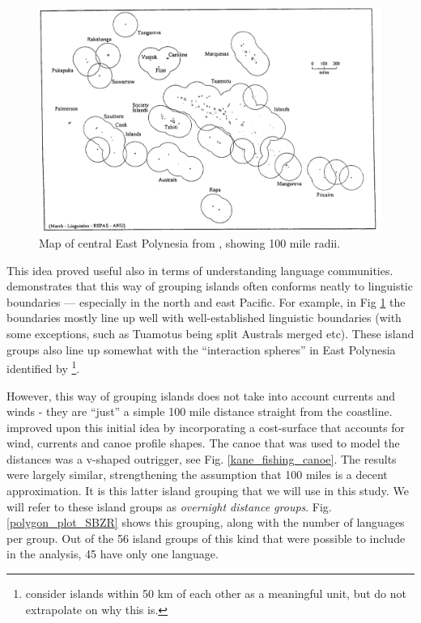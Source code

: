 \documentclass[unnumsec,webpdf,modern,medium]{oup-authoring-template}
\begin{document}
\begin{appendices}
\begin{figure}[ht]
\centering
\includegraphics[width=\textwidth]{marck_2000_east_poly.png}
\caption{{Map of central East Polynesia from \citet{marck2000}, showing 100 mile radii.}}
\label{Marck_2000_east_poly}
\end{figure}

This idea proved useful also in terms of understanding language communities. \citet{mark_1986, marck2000} demonstrates that this way of grouping islands often conforms neatly to linguistic boundaries --- especially in the north and east Pacific. For example, in Fig  \ref{Marck_2000_east_poly} the boundaries mostly line up well with well-established linguistic boundaries (with some exceptions, such as Tuamotus being split Australs merged etc). These island groups also line up somewhat with the ``interaction spheres'' in East Polynesia identified by \citet{rolett2002voyaging}\footnote{\citet{rolett2004environmental} consider islands within 50 km of each other as a meaningful unit, but do not extrapolate on why this is.}. 

However, this way of grouping islands does not take into account currents and winds - they are ``just'' a simple 100 mile distance straight from the coastline. \citet{NZSA_overnight_2023} improved upon this initial idea by incorporating a cost-surface that accounts for wind, currents and canoe profile shapes. The canoe that was used to model the distances was a v-shaped outrigger, see Fig. \ref{kane_fishing_canoe}. The results were largely similar, strengthening the assumption that 100 miles is a decent approximation. It is this latter island grouping that we will use in this study. We will refer to these island groups as \textit{overnight distance groups}. Fig. \ref{polygon_plot_SBZR} shows this grouping, along with the number of languages per group. Out of the 56 island groups of this kind that were possible to include in the analysis, 45 have only one language.


\end{appendices}
\end{document}
